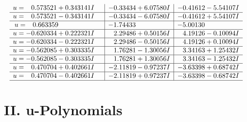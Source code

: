 \documentclass[1p]{elsarticle_modified}
\theoremstyle{definition}
\begin{document}
$$\begin{array}{c|c|c}
\begin{aligned}
u &= \phantom{-}0.573521 + 0.343141 I\end{aligned}
 & -0.33434 + 6.07580 I & -0.41612 - 5.54107 I \\ \hline\begin{aligned}
u &= \phantom{-}0.573521 - 0.343141 I\end{aligned}
 & -0.33434 - 6.07580 I & -0.41612 + 5.54107 I \\ \hline\begin{aligned}
u &= \phantom{-}0.663359\phantom{ +0.000000I}\end{aligned}
 & -1.74433\phantom{ +0.000000I} & -5.00130\phantom{ +0.000000I} \\ \hline\begin{aligned}
u &= -0.620334 + 0.222321 I\end{aligned}
 & \phantom{-}2.29486 + 0.50156 I & \phantom{-}4.19126 - 0.10094 I \\ \hline\begin{aligned}
u &= -0.620334 - 0.222321 I\end{aligned}
 & \phantom{-}2.29486 - 0.50156 I & \phantom{-}4.19126 + 0.10094 I \\ \hline\begin{aligned}
u &= -0.562085 + 0.303335 I\end{aligned}
 & \phantom{-}1.76281 - 1.30056 I & \phantom{-}3.34163 + 1.25432 I \\ \hline\begin{aligned}
u &= -0.562085 - 0.303335 I\end{aligned}
 & \phantom{-}1.76281 + 1.30056 I & \phantom{-}3.34163 - 1.25432 I \\ \hline\begin{aligned}
u &= \phantom{-}0.470704 + 0.402661 I\end{aligned}
 & -2.11819 - 0.97237 I & -3.63398 + 0.68742 I \\ \hline\begin{aligned}
u &= \phantom{-}0.470704 - 0.402661 I\end{aligned}
 & -2.11819 + 0.97237 I & -3.63398 - 0.68742 I\\
 \hline 
 \end{array}$$\newpage
\newpage\renewcommand{\arraystretch}{1}
\centering \section*{ II. u-Polynomials}
\end{document}
